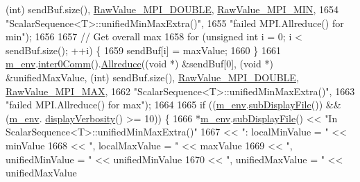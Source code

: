 \begin{DoxyCode}
       (\textcolor{keywordtype}{int}) sendBuf.size(), \hyperlink{_mpi_comm_8h_ad0f503bd9fecfe4e570ca3d15aaf2518}{RawValue\_MPI\_DOUBLE}, \hyperlink{_mpi_comm_8h_a8e30f42fdac116861205e83e2aa18042}{RawValue\_MPI\_MIN},
1654                                    \textcolor{stringliteral}{"ScalarSequence<T>::unifiedMinMaxExtra()"},
1655                                    \textcolor{stringliteral}{"failed MPI.Allreduce() for min"});
1656 
1657       \textcolor{comment}{// Get overall max}
1658       \textcolor{keywordflow}{for} (\textcolor{keywordtype}{unsigned} \textcolor{keywordtype}{int} i = 0; i < sendBuf.size(); ++i) \{
1659         sendBuf[i] = maxValue;
1660       \}
1661       \hyperlink{class_q_u_e_s_o_1_1_scalar_sequence_a71618cd6351b29361b437af68447a4c8}{m\_env}.\hyperlink{class_q_u_e_s_o_1_1_base_environment_a689e4d140c74d495d97eb498714a4b82}{inter0Comm}().\hyperlink{class_q_u_e_s_o_1_1_mpi_comm_a72e137e60ef8060efb1ee5fc874fa4b8}{Allreduce}((\textcolor{keywordtype}{void} *) &sendBuf[0], (\textcolor{keywordtype}{void} *) &unifiedMaxValue,
       (\textcolor{keywordtype}{int}) sendBuf.size(), \hyperlink{_mpi_comm_8h_ad0f503bd9fecfe4e570ca3d15aaf2518}{RawValue\_MPI\_DOUBLE}, \hyperlink{_mpi_comm_8h_a68f3ac7ff71a6504e236b0c95de78178}{RawValue\_MPI\_MAX},
1662                                    \textcolor{stringliteral}{"ScalarSequence<T>::unifiedMinMaxExtra()"},
1663                                    \textcolor{stringliteral}{"failed MPI.Allreduce() for max"});
1664 
1665       \textcolor{keywordflow}{if} ((\hyperlink{class_q_u_e_s_o_1_1_scalar_sequence_a71618cd6351b29361b437af68447a4c8}{m\_env}.\hyperlink{class_q_u_e_s_o_1_1_base_environment_a8a0064746ae8dddfece4229b9ad374d6}{subDisplayFile}()) && (\hyperlink{class_q_u_e_s_o_1_1_scalar_sequence_a71618cd6351b29361b437af68447a4c8}{m\_env}.
      \hyperlink{class_q_u_e_s_o_1_1_base_environment_a1fe5f244fc0316a0ab3e37463f108b96}{displayVerbosity}() >= 10)) \{
1666         *\hyperlink{class_q_u_e_s_o_1_1_scalar_sequence_a71618cd6351b29361b437af68447a4c8}{m\_env}.\hyperlink{class_q_u_e_s_o_1_1_base_environment_a8a0064746ae8dddfece4229b9ad374d6}{subDisplayFile}() << \textcolor{stringliteral}{"In ScalarSequence<T>::unifiedMinMaxExtra()"}
1667                                 << \textcolor{stringliteral}{": localMinValue = "}   << minValue
1668                                 << \textcolor{stringliteral}{", localMaxValue = "}   << maxValue
1669                                 << \textcolor{stringliteral}{", unifiedMinValue = "} << unifiedMinValue
1670                                 << \textcolor{stringliteral}{", unifiedMaxValue = "} << unifiedMaxValue

\end{DoxyCode}
